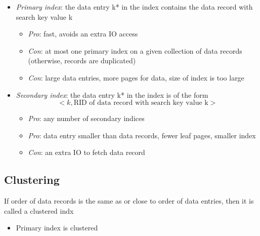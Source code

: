    \begin{itemize}
      \item \emph{Primary index}: the data entry k* in the index contains
      the data record with search key value k
      \begin{itemize}
        \item \emph{Pro}: fast, avoids an extra IO access
        \item \emph{Con}: at most one primary index on a given collection of
        data records (otherwise, records are duplicated)
        \item \emph{Con}: large data entries, more pages for data, size of
        index is too large
      \end{itemize}

      \item \emph{Secondary index}: the data entry k* in the index is of the form
      \begin{equation}
        <k, \text{RID of data record with search key value k}>
      \end{equation}
      \begin{itemize}
        \item \emph{Pro}: any number of secondary indices
        \item \emph{Pro}: data entry smaller than data records, fewer leaf pages,
        smaller index
        \item \emph{Con}: an extra IO to fetch data record
      \end{itemize}
    \end{itemize}

  \subsection{Clustering}

    If order of data records is the same as or close to order of data
    entries, then it is called a clustered indx

    \begin{itemize}
      \item Primary index is clustered
    \end{itemize}
